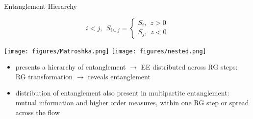 \documentclass[12pt,aspectratio=169]{beamer}
\begin{document}
\begin{frame}{Entanglement Hierarchy}
\begin{minipage}{0.5\textwidth}
\[i < j, ~ ~ S_{i\cup j} =
	\begin{cases}
	S_{i}, ~ ~ z > 0\\
	S_{j}, ~ ~ z < 0
	\end{cases}
\]
\end{minipage}
\begin{minipage}{0.45\textwidth}
\texttt{[image: figures/Matroshka.png]}
\texttt{[image: figures/nested.png]}
\end{minipage}

\vspace*{\fill}

\begin{itemize}
	\item 
presents a \alert{hierarchy} of entanglement \(\longrightarrow\) EE distributed across RG steps:\\[10pt]
RG transformation \(\longrightarrow\) reveals entanglement

\vspace*{\fill}
\item distribution of entanglement also present in \alert{multipartite} entanglement:\\[10pt]
	mutual information and higher order measures, within one RG step or spread across the flow
\end{itemize}

\end{frame}
\end{document}
